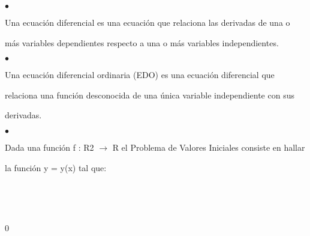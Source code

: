 \documentclass[a4paper,portrait,12pt]{article}
\begin{document}
$\bullet$





\begin{flushleft}
Una ecuación diferencial es una ecuación que relaciona las derivadas de una o
\end{flushleft}





\begin{flushleft}
\newpage
más variables dependientes respecto a una o más variables independientes.
\end{flushleft}


$\bullet$





\begin{flushleft}
Una ecuación diferencial ordinaria (EDO) es una ecuación diferencial que
\end{flushleft}


\begin{flushleft}
relaciona una función desconocida de una única variable independiente con sus
\end{flushleft}


\begin{flushleft}
derivadas.
\end{flushleft}





$\bullet$





\begin{flushleft}
Dada una función f : R2 $\rightarrow$ R el Problema de Valores Iniciales consiste en hallar
\end{flushleft}


\begin{flushleft}
la función y = y(x) tal que:
\end{flushleft}


\begin{flushleft}

\end{flushleft}


\begin{flushleft}

\end{flushleft}


0


\begin{flushleft}

\end{flushleft}
\end{document}
